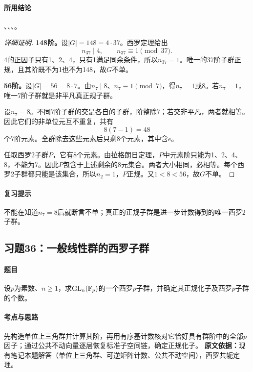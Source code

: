 \paragraph{所用结论}、、、。
\begin{proof}[详细证明]
\textbf{148阶。}设$|G|=148=4\cdot37$。西罗定理给出
\[
n_{37}\mid4,\qquad n_{37}\equiv1\pmod{37}.
\]
4的正因子只有1、2、4，只有1满足同余条件，所以$n_{37}=1$。唯一的37阶子群正规，且其阶既不为1也不为148，故$G$不单。

\textbf{56阶。}设$|G|=56=8\cdot7$。由$n_7\mid8$、$n_7\equiv1\pmod7$，得$n_7=1$或8。若$n_7=1$，唯一7阶子群就是非平凡真正规子群。

设$n_7=8$。不同7阶子群的交是各自的子群，阶整除7；若交非平凡，两者就相等。因此它们的非单位元互不重复，共有
\[
8(7-1)=48
\]
个7阶元素。全群除去这些元素后只剩8个元素，其中含$e$。

任取西罗2子群$P$，它有8个元素。由拉格朗日定理，$P$中元素阶只能为1、2、4、8，不能为7。因此$P$包含于上述剩余的8元集合。两者大小相同，必相等。每个西罗2子群都只能是该集合，所以$n_2=1$，$P$正规。又$1<8<56$，故$G$不单。
\end{proof}
\paragraph{复习提示}不能在知道$n_7=8$后就断言不单；真正的正规子群是进一步计数得到的唯一西罗2子群。

\subsection{习题36：一般线性群的西罗子群}
\paragraph{题目}设$p$为素数、$n\ge1$，求$\operatorname{GL}_n(\mathbb F_p)$的一个西罗$p$子群，并确定其正规化子及西罗$p$子群的个数。
\paragraph{考点与思路}先构造单位上三角群并计算其阶，再用有序基计数核对它恰好具有群阶中的全部$p$因子；通过公共不动向量逐层恢复标准子空间链，确定正规化子。
\textbf{原文依据：}现有笔记本题解答（单位上三角群、可逆矩阵计数、公共不动空间），西罗共轭定理。
